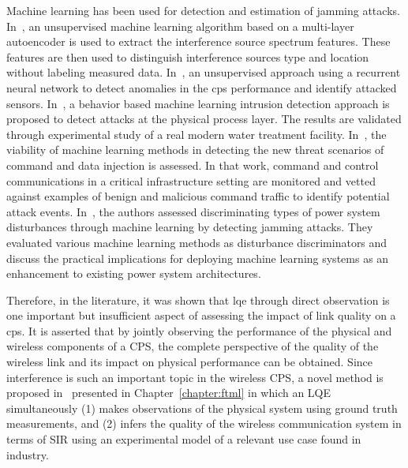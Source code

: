 Machine learning has been used for detection and estimation of jamming attacks. In~\cite{Chen2019}, an unsupervised machine learning algorithm based on a multi-layer autoencoder is used to extract the interference source spectrum features. These features are then used to distinguish interference sources type and location without labeling measured data. In~\cite{7911887},  an unsupervised approach using a recurrent neural network to detect anomalies in the \gls{cps} performance and identify attacked sensors. In~\cite{Junejo2016DataDP}, a behavior based machine learning intrusion detection approach  is proposed to detect attacks at the physical process layer. The results are validated through experimental study of a real modern water treatment facility. In~\cite{Beaver:2013:EML:2584691.2584722}, the viability of machine learning methods in detecting the new threat scenarios of command and data injection is assessed. In that work, command and control communications in a critical infrastructure setting are monitored and vetted against examples of benign and malicious command traffic to identify potential attack events. In~\cite{6900095}, the authors assessed discriminating types of power system disturbances through machine learning by detecting jamming attacks. They evaluated various machine learning methods as disturbance discriminators and discuss the practical implications for deploying machine learning systems as an enhancement to existing power system architectures.

Therefore, in the literature, it was shown that \gls{lqe} through direct observation is one important but insufficient aspect of assessing the impact of link quality on a \gls{cps}. It is asserted that by jointly observing the performance of the physical and wireless components of a CPS, the complete perspective of the quality of the wireless link and its impact on physical performance can be obtained. Since interference is such an important topic in the wireless CPS, a novel method is proposed in~\cite{Candell_ISIT_2019,Candell2020.Jrnl.Access} presented in Chapter~\ref{chapter:ftml} in which an LQE simultaneously (1) makes observations of the physical system using ground truth measurements, and (2) infers the quality of the wireless communication system in terms of SIR using an experimental model of a relevant use case found in industry.


